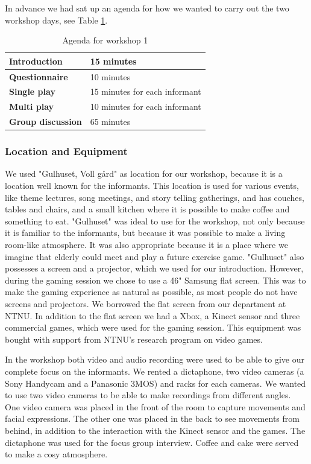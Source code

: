 In advance we had sat up an agenda for how we wanted to carry out the two workshop days,  see Table \ref{tab:agendaW1}.  

\begin{table} [H]
\centering
    \begin{tabular}{|l|l|}
       \hline
       \textbf{Introduction} & 15 minutes  \\ \hline
       \textbf{Questionnaire} & 10 minutes  \\ \hline
       \textbf{Single play} & 15 minutes for each informant \\ \hline
       \textbf{Multi play} & 10 minutes for each informant \\ \hline
	   \textbf{Group discussion} & 65 minutes \\ \hline
    \end{tabular}
    \caption[Workshop 1 agenda]{Agenda for workshop 1}
    \label{tab:agendaW1}
\end{table}  

\subsubsection{Location and Equipment}
We used "Gulhuset, Voll gård" as location for our workshop, because it is a location well known for the informants. This location is used for various events, like theme lectures, song meetings, and story telling gatherings, and has couches, tables and chairs, and a small kitchen where it is possible to make coffee and something to eat. "Gulhuset" was ideal to use for the workshop, not only because it is familiar to the informants, but because it was possible to make a living room-like atmosphere. It was also appropriate because it is a place where we imagine that elderly could meet and play a future exercise game. "Gulhuset" also possesses a screen and a projector, which we used for our introduction. However, during the gaming session we chose to use a 46" Samsung flat screen. This was to make the gaming experience as natural as possible, as most people do not have screens and projectors. We borrowed the flat screen from our department at NTNU. In addition to the flat screen we had a Xbox, a Kinect sensor and three commercial games, which were used for the gaming session. This equipment was bought with support from NTNU's research program on video games.   

In the workshop both video and audio recording were used to be able to give our complete focus on the informants. We rented a dictaphone, two video cameras (a Sony Handycam and a Panasonic 3MOS) and racks for each cameras. We wanted to use two video cameras to be able to make recordings from different angles. One video camera was placed in the front of the room to capture movements and facial expressions. The other one was placed in the back to see movements from behind, in addition to the interaction with the Kinect sensor and the games. The dictaphone was used for the focus group interview. Coffee and cake were served to make a cosy atmosphere. 

